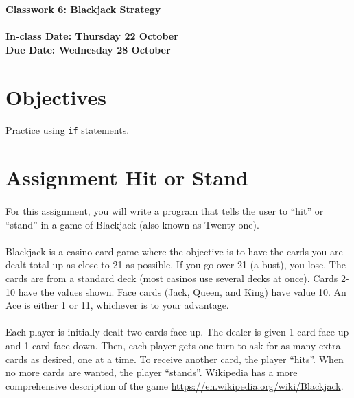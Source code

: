 \documentclass[letter,10pt]{article}
\begin{document}
    
    \huge
    \textbf{Classwork 6: Blackjack Strategy}
    \normalsize
    \\ ~~ \\
    \textbf{In-class Date: Thursday 22 October} \\
    \textbf{Due Date: Wednesday 28 October}
    
    \section*{Objectives}
    \paragraph{}Practice using \texttt{if} statements.
    
    \section*{Assignment Hit or Stand}
    \paragraph{}For this assignment, you will write a program that tells the user to ``hit'' or ``stand'' in a game of Blackjack (also known as Twenty-one).
    \paragraph{}Blackjack is a casino card game where the objective is to have the cards you are dealt total up as close to 21 as possible. If you go over 21 (a bust), you lose. The cards are from a standard deck (most casinos use several decks at once). Cards 2-10 have the values shown. Face cards (Jack, Queen, and King) have value 10. An Ace is either 1 or 11, whichever is to your advantage.
    \paragraph{}Each player is initially dealt two cards face up. The dealer is given 1 card face up and 1 card face down. Then, each player gets one turn to ask for as many extra cards as desired, one at a time. To receive another card, the player ``hits''. When no more cards are wanted, the player ``stands''. Wikipedia has a more comprehensive description of the game \url{https://en.wikipedia.org/wiki/Blackjack}.
\end{document}
